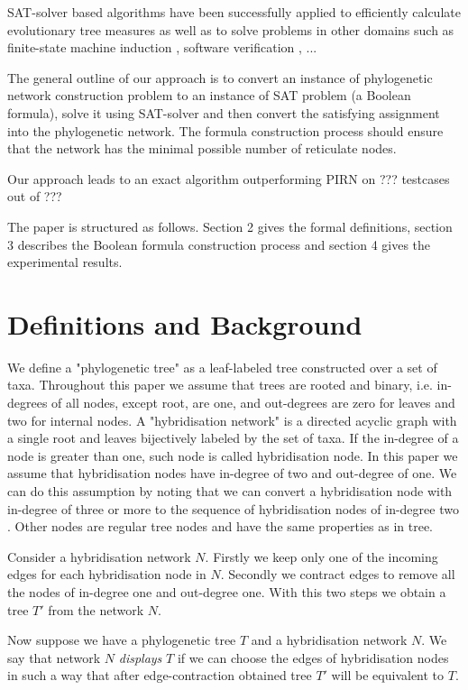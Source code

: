 \documentclass[runningheads, envcountsame, a4paper]{llncs}
\begin{document}
SAT-solver based algorithms have been successfully applied to efficiently calculate evolutionary tree measures \cite{bonet}
as well as to solve problems in other domains such as
finite-state machine induction \cite{heule}, software verification \cite{}, ...

The general outline of our approach is to convert an instance of phylogenetic network construction 
problem to an instance of SAT problem (a Boolean formula), solve it using SAT-solver and then convert 
the satisfying assignment into the phylogenetic network. The formula construction process should ensure that
the network has the minimal possible number of reticulate nodes.

Our approach leads to an exact algorithm outperforming PIRN on ??? testcases out of ???

The paper is structured as follows. Section 2 gives the formal definitions, section 3 describes the Boolean formula
construction process and section 4 gives the experimental results.

\section{Definitions and Background}

We define a "phylogenetic tree" as a leaf-labeled tree constructed over a set of taxa. Throughout this paper we assume that trees are rooted and binary, i.e. in-degrees of all nodes, except root, are one, and out-degrees are zero for leaves and two for internal nodes. A "hybridisation network" is a directed acyclic graph with a single root and leaves bijectively labeled by the set of taxa. If the in-degree of a node is greater than one, such node is called hybridisation node. In this paper we assume that hybridisation nodes have in-degree of two and out-degree of one. We can do this assumption by noting that we can convert a hybridisation node with in-degree of three or more to the sequence of hybridisation nodes of in-degree two \cite{Y. Wu. Close lower and upper bounds for the minimum reticulate network of multiple phylogenetic trees}. Other nodes are regular tree nodes and have the same properties as in tree.

Consider a hybridisation network $N$. Firstly we keep only one of the incoming edges for each hybridisation node in $N$. Secondly we contract edges to remove all the nodes of in-degree one and out-degree one. With this two steps we obtain a tree $T'$ from the network $N$.

Now suppose we have a phylogenetic tree $T$ and a hybridisation network $N$. We say that network $N$ \emph{displays} $T$ if we can choose the edges of hybridisation nodes in such a way that after edge-contraction obtained tree $T'$ will be equivalent to $T$.
\end{document}
